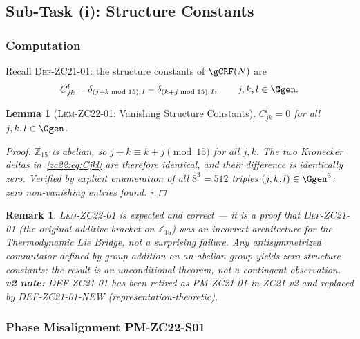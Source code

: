 \documentclass[12pt, a4paper]{article}
\newtheorem{lemma}{Lemma}[section]
\newtheorem{remark}{Remark}[section]
\begin{document}
\subsection{Sub-Task (i): Structure Constants}
\label{zc22:sec:i}

\subsubsection{Computation}

Recall \textsc{Def-ZC21-01}: the structure constants of $\gCRF(N)$ are
\begin{equation}
  C_{jk}^l = \delta_{(j+k \bmod 15),\,l} - \delta_{(k+j \bmod 15),\,l},
  \qquad j,k,l \in \Ggen.
  \label{zc22:eq:Cjkl}
\end{equation}

\begin{lemma}[\textsc{Lem-ZC22-01}: Vanishing Structure Constants]
\label{zc22:lem:zero-C}
$C_{jk}^l = 0$ for all $j,k,l \in \Ggen$.
\begin{proof}
$\mathbb{Z}_{15}$ is abelian, so $j + k \equiv k + j \pmod{15}$ for all $j,k$.
The two Kronecker deltas in~\eqref{zc22:eq:Cjkl} are therefore identical,
and their difference is identically zero.
Verified by explicit enumeration of all $8^3 = 512$ triples
$(j,k,l) \in \Ggen^3$: zero non-vanishing entries found.
\hfill$\square$
\end{proof}
\end{lemma}

\begin{remark}
\textsc{Lem-ZC22-01} is \emph{expected and correct} — it is a proof that
\textsc{Def-ZC21-01} (the original additive bracket on $\mathbb{Z}_{15}$)
was an incorrect architecture for the Thermodynamic Lie Bridge,
not a surprising failure.
Any antisymmetrized commutator defined by group addition on an abelian group
yields zero structure constants; the result is an unconditional theorem,
not a contingent observation.
\textbf{v2 note:} DEF-ZC21-01 has been retired as PM-ZC21-01 in ZC21-v2
and replaced by DEF-ZC21-01-NEW (representation-theoretic).
\end{remark}

\subsubsection{Phase Misalignment PM-ZC22-S01}
\end{document}
